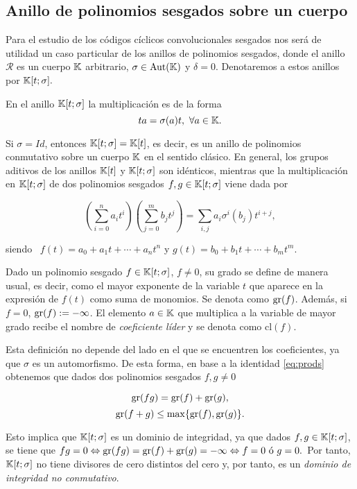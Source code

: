 \subsection{Anillo de polinomios sesgados sobre un cuerpo}\label{sec:ore}

Para el estudio de los códigos cíclicos convolucionales sesgados nos será de utilidad un caso particular de los anillos de polinomios sesgados, donde el anillo $\mathcal{R}$ es un cuerpo $\mathbb{K}$ arbitrario, $\sigma \in \text{Aut}(\mathbb{K})$ y $\delta = 0$. Denotaremos a estos anillos por $\mathbb{K}[t;\sigma].$

En el anillo $\mathbb{K}[t;\sigma]$ la multiplicación es de la forma $$ta = \sigma(a)t, \ \forall a \in \mathbb{K}.$$

Si $\sigma = Id$, entonces $\mathbb{K}[t;\sigma] = \mathbb{K}[t]$, es decir, es un anillo de polinomios conmutativo sobre un cuerpo $\mathbb{K}$ en el sentido clásico. En general, los grupos aditivos de los anillos $\mathbb{K}[t]$ y $\mathbb{K}[t;\sigma]$ son idénticos, mientras que la multiplicación en $\mathbb{K}[t;\sigma]$ de dos polinomios sesgados $f,g \in \mathbb{K}[t;\sigma]$ viene dada por

\begin{equation}\label{eq:prods} \left(\sum_{i=0}^{n} a_it^i\right)\left(\sum_{j=0}^{m}b_jt^j\right) = \sum_{i,j}a_i\sigma^i(b_j)t^{i+j},\end{equation}


siendo \ $f(t) = a_0 + a_1t + \cdots + a_nt^n$ y $g(t) = b_0 + b_1t + \cdots + b_mt^m.$

Dado un polinomio sesgado $f \in \mathbb{K}[t;\sigma]$, $f \neq 0$, su grado se define de manera usual, es decir, como el mayor exponente de la variable $t$ que aparece en la expresión de $f(t)$ como suma de monomios. Se denota como $\operatorname{gr}(f)$. Además, si $f = 0$, $\operatorname{gr}(f) := - \infty$. El elemento $a \in \mathbb{K}$ que multiplica a la variable de mayor grado recibe el nombre de \emph{coeficiente líder} y se denota como $\text{cl}(f)$.

Esta definición no depende del lado en el que se encuentren los coeficientes, ya que $\sigma$ es un automorfismo. De esta forma, en base a la identidad \eqref{eq:prods} obtenemos que dados dos polinomios sesgados $f,g \neq 0$

$$\operatorname{gr}(fg) = \operatorname{gr}(f) + \operatorname{gr}(g),$$
$$\operatorname{gr}(f + g) \leq \max\{\operatorname{gr}(f),\operatorname{gr}(g)\}.$$

Esto implica que $\mathbb{K}[t;\sigma]$ es un dominio de integridad, ya que dados $f,g \in \mathbb{K}[t;\sigma]$, se tiene que $fg = 0 \Leftrightarrow \operatorname{gr}(fg) = \operatorname{gr}(f) + \operatorname{gr}(g) = -\infty \Leftrightarrow f = 0 \text{ ó } g = 0.$ Por tanto, $\mathbb{K}[t;\sigma]$ no tiene divisores de cero distintos del cero y, por tanto, es un \emph{dominio de integridad no conmutativo}.

